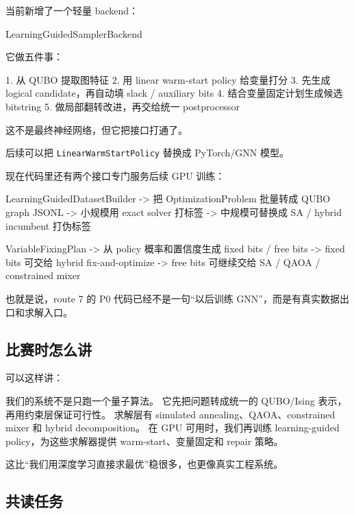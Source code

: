 \documentclass[UTF8,12pt,a4paper]{ctexart}
\begin{document}
当前新增了一个轻量 backend：

\begin{GuideVerbatim}
LearningGuidedSamplerBackend
\end{GuideVerbatim}

它做五件事：

\begin{GuideVerbatim}
1. 从 QUBO 提取图特征
2. 用 linear warm-start policy 给变量打分
3. 先生成 logical candidate，再自动填 slack / auxiliary bits
4. 结合变量固定计划生成候选 bitstring
5. 做局部翻转改进，再交给统一 postprocessor
\end{GuideVerbatim}

这不是最终神经网络，但它把接口打通了。

后续可以把 \texttt{LinearWarmStartPolicy} 替换成 PyTorch/GNN 模型。

现在代码里还有两个接口专门服务后续 GPU 训练：

\begin{GuideVerbatim}
LearningGuidedDatasetBuilder
  -> 把 OptimizationProblem 批量转成 QUBO graph JSONL
  -> 小规模用 exact solver 打标签
  -> 中规模可替换成 SA / hybrid incumbent 打伪标签

VariableFixingPlan
  -> 从 policy 概率和置信度生成 fixed bits / free bits
  -> fixed bits 可交给 hybrid fix-and-optimize
  -> free bits 可继续交给 SA / QAOA / constrained mixer
\end{GuideVerbatim}

也就是说，route 7 的 P0 代码已经不是一句“以后训练 GNN”，而是有真实数据出口和求解入口。

\subsection*{比赛时怎么讲}

可以这样讲：

\begin{GuideVerbatim}
我们的系统不是只跑一个量子算法。
它先把问题转成统一的 QUBO/Ising 表示，再用约束层保证可行性。
求解层有 simulated annealing、QAOA、constrained mixer 和 hybrid decomposition。
在 GPU 可用时，我们再训练 learning-guided policy，为这些求解器提供 warm-start、变量固定和 repair 策略。
\end{GuideVerbatim}

这比“我们用深度学习直接求最优”稳很多，也更像真实工程系统。

\subsection*{共读任务}
\end{document}
